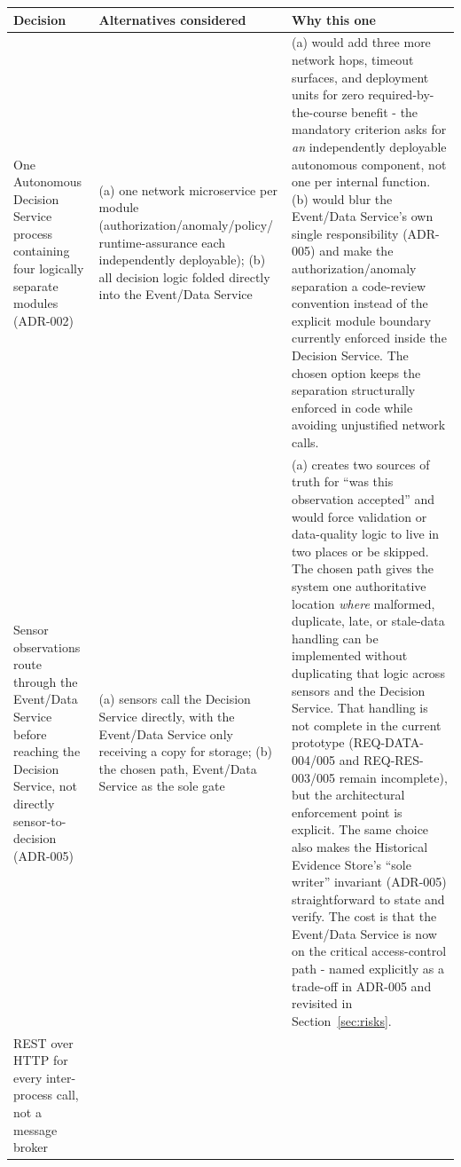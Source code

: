 \documentclass[11pt]{article}
\begin{document}
\begin{longtable}[]{@{}
  >{\raggedright\arraybackslash}p{}
  >{\raggedright\arraybackslash}p{}
  >{\raggedright\arraybackslash}p{}@{}}
\toprule
\textbf{Decision} & \textbf{Alternatives considered} & \textbf{Why this one} \\
\midrule
\endhead
One Autonomous Decision Service process containing four logically
separate modules (ADR-002) &
(a) one network microservice per module (authorization/anomaly/policy/
runtime-assurance each independently deployable); (b) all decision logic
folded directly into the Event/Data Service &
(a) would add three more network hops, timeout surfaces, and deployment
units for zero required-by-the-course benefit - the mandatory criterion
asks for \emph{an} independently deployable autonomous component, not one
per internal function. (b) would blur the Event/Data Service's own
single responsibility (ADR-005) and make the authorization/anomaly separation a code-review convention
instead of the explicit module boundary currently enforced inside the
Decision Service. The
chosen option keeps the separation structurally enforced in code while
avoiding unjustified network calls. \\
Sensor observations route through the Event/Data Service before
reaching the Decision Service, not directly sensor-to-decision
(ADR-005) &
(a) sensors call the Decision Service directly, with the Event/Data
Service only receiving a copy for storage; (b) the chosen path, Event/Data
Service as the sole gate &
(a) creates two sources of truth for ``was this observation accepted'' and
would force validation or data-quality logic to live in two places or be
skipped. The chosen path gives the system one authoritative location
\emph{where} malformed, duplicate, late, or stale-data handling can be
implemented without duplicating that logic across sensors and the Decision
Service. That handling is not complete in the current prototype
(REQ-DATA-004/005 and REQ-RES-003/005 remain incomplete), but the
architectural enforcement point is explicit. The same choice also makes
the Historical Evidence Store's ``sole writer'' invariant (ADR-005)
straightforward to state and verify. The cost is that the Event/Data
Service is now on the critical access-control path - named explicitly as
a trade-off in ADR-005 and revisited in Section~\ref{sec:risks}. \\
REST over HTTP for every inter-process call, not a message broker &

\end{longtable}
\end{document}
